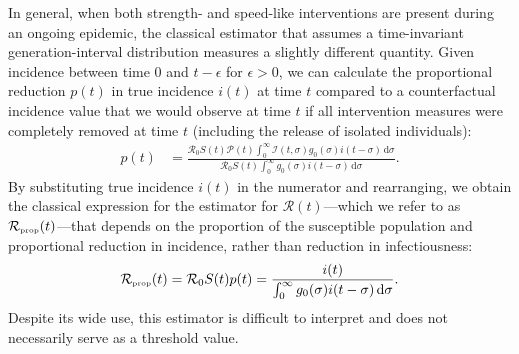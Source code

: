 \documentclass[12pt]{article}
\newcommand{\Rx}[1]{\ensuremath{{\mathcal R}_{#1}}\xspace}
\newcommand{\Ro}{\Rx{0}}
\newcommand{\RR}{\ensuremath{{\mathcal R}}\xspace}
\newcommand{\tsub}[2]{#1_{{\textrm{\tiny #2}}}}
\newcommand{\dd}[1]{\ensuremath{\, \mathrm{d}#1}}
\newcommand{\dsigma}{\dd{\sigma}}
\newcommand{\PP}{{\mathcal P}}
\newcommand{\II}{{\mathcal I}}
\begin{document}
In general, when both strength- and speed-like interventions are present during an ongoing epidemic, the classical estimator that assumes a time-invariant generation-interval distribution measures a slightly different quantity.
Given incidence between time $0$ and $t-\epsilon$ for $\epsilon > 0$, we can calculate the proportional reduction $p(t)$ in true incidence $i(t)$ at time $t$ compared to a counterfactual incidence value that we would observe at time $t$ if all intervention measures were completely removed at time $t$ (including the release of isolated individuals):
\begin{align}
p(t) &= \frac{\Ro S(t) \PP(t) \int_0^\infty \II(t, \sigma) g_0(\sigma) i(t-\sigma)\dsigma}{\Ro S(t) \int_0^\infty g_0(\sigma) i(t-\sigma) \dsigma}.
\end{align}
By substituting true incidence $i(t)$ in the numerator and rearranging, we obtain the classical expression for the estimator for $\RR(t)$---which we refer to as $\tsub{\RR}{prop}(t)$---that depends on the proportion of the susceptible population and proportional reduction in incidence, rather than reduction in infectiousness:
\begin{equation}
\tsub{\RR}{prop}(t) = \Ro S(t) p(t) = \frac{i(t)}{\int_0^\infty g_0(\sigma) i(t-\sigma) \dsigma}.
\end{equation}
Despite its wide use, this estimator is difficult to interpret and does not necessarily serve as a threshold value.
\end{document}
